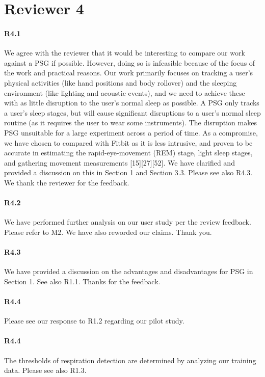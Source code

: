 \section*{Reviewer 4}

\paragraph{R4.1} We agree with the reviewer that it would be interesting to compare our work against a PSG if possible. However, doing so
is infeasible because of the focus of the work and practical reasons. Our work primarily focuses on tracking a user's physical activities
(like hand positions and body rollover) and the sleeping environment (like lighting and acoustic events), and we need to achieve these with
as little disruption to the user's normal sleep as possible. A PSG only tracks a user's sleep stages, but will cause significant
disruptions to a user's normal sleep routine (as it requires the user to wear some instruments). The disruption makes PSG unsuitable for a
large experiment across a period of time. As a compromise, we have chosen to compared with Fitbit as it is less intrusive, and proven to be
accurate in estimating the rapid-eye-movement (REM) stage, light sleep stages, and gathering movement
measurements [15][27][52]. We have clarified and provided a discussion on this in Section 1 and Section 3.3. Please see also R4.3. We
thank the reviewer for the feedback.

\paragraph{R4.2} We have performed further analysis on our user study per the review feedback. Please refer to M2. We have also reworded our
claims. Thank you. \vspace{-2mm}

\paragraph{R4.3} We have provided a discussion on the advantages and disadvantages for PSG in Section 1. See also R1.1. Thanks for the feedback.
\vspace{-2mm}
\paragraph{R4.4} Please see our response to R1.2 regarding our pilot study.
\vspace{-2mm}
\paragraph{R4.4} The thresholds of respiration detection are determined by analyzing our training data. Please
see also R1.3.
\vspace{-2mm}

